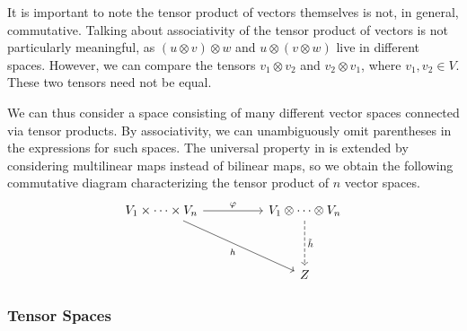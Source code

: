 \documentclass[a4paper,12pt]{article}
\begin{document}
\begin{remark}
    It is important to note the tensor product of vectors themselves is not, in general, commutative.
    Talking about associativity of the tensor product of vectors is not particularly meaningful, as $(u \otimes v) \otimes w$ and $u \otimes (v \otimes w)$ live in different spaces.
    However, we can compare the tensors $v_1 \otimes v_2$ and $v_2 \otimes v_1$, where $v_1, v_2 \in V$.
    These two tensors need not be equal.
\end{remark}
We can thus consider a space consisting of many different vector spaces connected via tensor products.
By associativity, we can unambiguously omit parentheses in the expressions for such spaces.
The universal property in  is extended by considering multilinear maps instead of bilinear maps, so we obtain the following commutative diagram characterizing the tensor product of $n$ vector spaces.
\[\begin{tikzcd}
        {V_1 \times \cdots \times V_n} && {V_1 \otimes \cdots \otimes V_n} \\
        \\
        && Z
        \arrow["\varphi", from=1-1, to=1-3]
        \arrow["h"', from=1-1, to=3-3]
        \arrow["{\tilde{h}}", dashed, from=1-3, to=3-3]
\end{tikzcd}\]

\subsubsection{Tensor Spaces}\label{subsubsec:multilinear_algebra:tensors:tensor_spaces}
\end{document}
